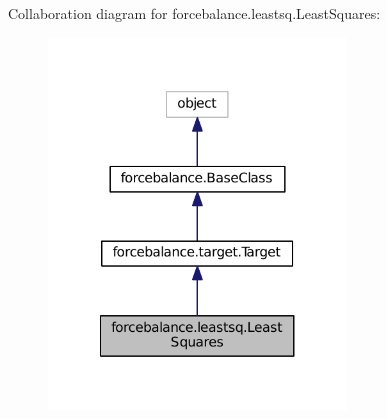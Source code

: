 Collaboration diagram for forcebalance.\-leastsq.\-Least\-Squares\-:
\nopagebreak
\begin{figure}[H]
\begin{center}
\leavevmode
\includegraphics[width=224pt]{classforcebalance_1_1leastsq_1_1LeastSquares__coll__graph}
\end{center}
\end{figure}
